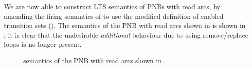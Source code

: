 We are now able to construct LTS semantics of PNBs with read arcs, by amending
the firing semantics of  to use the modified
definition of enabled transition sets ().
The \TLTS{} semantics of the PNB with read arcs shown in 
is shown in ; it is clear that the undesirable
\emph{additional} behaviour due to using remove/replace loops is no longer
present.

\begin{figure}[ht]
    \centering
    \caption{\TLTS{} semantics of the PNB with read arcs shown in
    .}
    \label{fig:readArcsLTS}
\end{figure}
